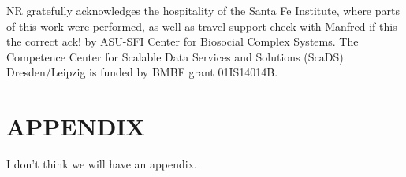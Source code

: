 \documentclass[a4paper,10pt]{article}
\newcommand{\TODO}[1]{\begingroup\color{red}#1\endgroup}
\begin{document}
NR gratefully acknowledges the hospitality of the Santa Fe Institute, where
parts of this work were performed, as well as travel support \TODO{check
  with Manfred if this the correct ack! by ASU-SFI Center for Biosocial
  Complex Systems. The Competence Center for Scalable Data Services and
  Solutions (ScaDS) Dresden/Leipzig is funded by BMBF grant 01IS14014B.}

\vfill

{\small
}

\section*{\uppercase{Appendix}}

\TODO{I don't think we will have an appendix.} 


\vfill
\end{document}
